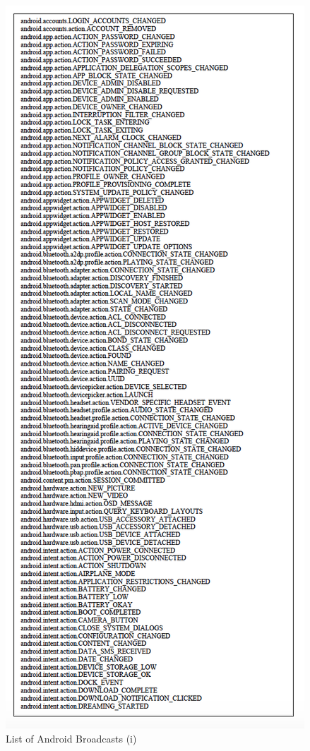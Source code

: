 \documentclass[12pt,twoside]{report}
\begin{document}
\begin{figure}
    \centering
    \includegraphics{figures/Broadcast1.png}
    \caption{List of Android Broadcasts (i)}
    \label{fig:my_label}
\end{figure} 
\end{document}

